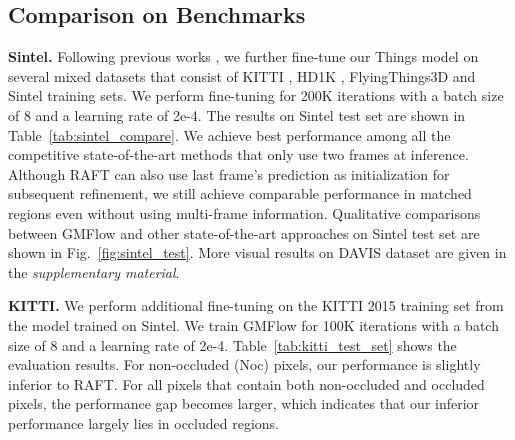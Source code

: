 \documentclass[10pt,twocolumn,letterpaper]{article}
\begin{document}
\subsection{Comparison on Benchmarks}
\label{sec:sintel_kitti}


{\bf Sintel.} Following previous works \cite{teed2020raft,xu2021high}, we further fine-tune our Things model on several mixed datasets that consist of KITTI \cite{menze2015object}, HD1K \cite{kondermann2016hci}, FlyingThings3D \cite{mayer2016large} and Sintel \cite{butler2012naturalistic} training sets. We perform fine-tuning for 200K iterations with a batch size of 8 and a learning rate of 2e-4. The results on Sintel test set are shown in Table~\ref{tab:sintel_compare}. We achieve best performance among all the competitive state-of-the-art methods that only use two frames at inference. Although RAFT can also use last frame's prediction as initialization for subsequent refinement, we still achieve comparable performance in matched regions even without using multi-frame information. Qualitative comparisons between GMFlow and other state-of-the-art approaches on Sintel test set are shown in Fig.~\ref{fig:sintel_test}. More visual results on DAVIS \cite{perazzi2016benchmark} dataset are given in the \emph{supplementary material}.


{\bf KITTI.} We perform additional fine-tuning on the KITTI 2015 training set from the model trained on Sintel. We train GMFlow for 100K iterations with a batch size of 8 and a learning rate of 2e-4. Table~\ref{tab:kitti_test_set} shows the evaluation results. For non-occluded (Noc) pixels, our performance is slightly inferior to RAFT. For all pixels that contain both non-occluded and occluded pixels, the performance gap becomes larger, which indicates that our inferior performance largely lies in occluded regions.








    
    
    
    
    
\end{document}
